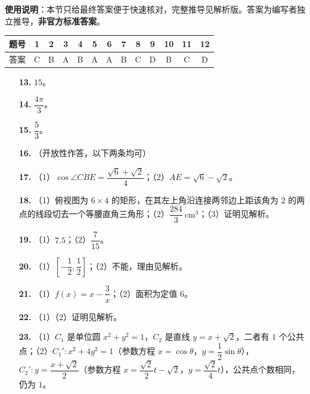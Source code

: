 
\begin{gknotice}
\textbf{使用说明}：本节只给最终答案便于快速核对，完整推导见解析版。答案为编写者独立推导，\textbf{非官方标准答案}。
\end{gknotice}

\begin{center}\begin{tabular}{ccccccccccccc}
\toprule
题号 & 1 & 2 & 3 & 4 & 5 & 6 & 7 & 8 & 9 & 10 & 11 & 12 \\
\midrule
答案 & C & B & A & B & A & A & B & C & D & B & C & D \\
\bottomrule
\end{tabular}\end{center}

\begin{itemize}[leftmargin=2.6em]
  \item[\textbf{13.}] $15$。
  \item[\textbf{14.}] $\dfrac{4\pi}3$。
  \item[\textbf{15.}] $\dfrac53$。
  \item[\textbf{16.}] （开放性作答，以下两条均可）
\end{itemize}

\begin{itemize}[leftmargin=2.6em]
  \item[\textbf{17.}] （1）$\cos\angle CBE=\dfrac{\sqrt6+\sqrt2}4$；（2）$AE=\sqrt6-\sqrt2$。
  \item[\textbf{18.}] （1）俯视图为 $6\times4$ 的矩形，在其左上角沿连接两邻边上距该角为 $2$ 的两点的线段切去一个等腰直角三角形；（2）$\dfrac{284}3\ \mathrm{cm^3}$；（3）证明见解析。
  \item[\textbf{19.}] （1）$7.5$；（2）$\dfrac7{15}$。
  \item[\textbf{20.}] （1）$\left[-\dfrac12,\dfrac12\right]$；（2）不能，理由见解析。
  \item[\textbf{21.}] （1）$f(x)=x-\dfrac3x$；（2）面积为定值 $6$。
\end{itemize}

\begin{itemize}[leftmargin=2.6em]
  \item[\textbf{22.}] （1）（2）证明见解析。
  \item[\textbf{23.}] （1）$C_1$ 是单位圆 $x^2+y^2=1$，$C_2$ 是直线 $y=x+\sqrt2$，二者有 $1$ 个公共点；（2）$C_1':x^2+4y^2=1$（参数方程 $x=\cos\theta$，$y=\dfrac12\sin\theta$），$C_2':y=\dfrac{x+\sqrt2}2$（参数方程 $x=\dfrac{\sqrt2}2t-\sqrt2$，$y=\dfrac{\sqrt2}4t$），公共点个数相同，仍为 $1$。
\end{itemize}
